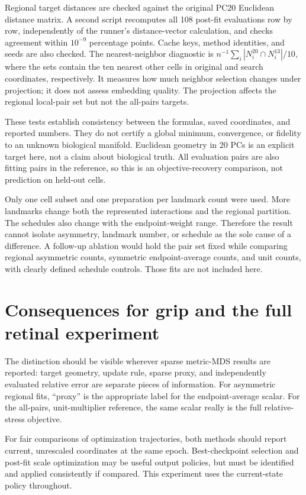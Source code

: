 \documentclass[11pt]{article}
\begin{document}
Regional target distances are checked against the original PC20 Euclidean
distance matrix. A second script recomputes all 108 post-fit evaluations
row by row, independently of the runner's distance-vector calculation,
and checks agreement within $10^{-9}$ percentage points. Cache keys,
method identities, and seeds are also checked.
The nearest-neighbor diagnostic is
$n^{-1}\sum_i |N_i^{20}\cap N_i^{13}|/10$, where the sets contain the ten
nearest other cells in original and search coordinates, respectively.
It measures how much neighbor selection changes under projection; it
does not assess embedding quality. The projection affects the regional
local-pair set but not the all-pairs targets.


These tests establish consistency between the formulas, saved coordinates,
and reported numbers. They do not certify a global minimum, convergence,
or fidelity to an unknown biological manifold. Euclidean geometry in 20 PCs
is an explicit target here, not a claim about biological truth.
All evaluation pairs are also fitting pairs in the reference, so this is
an objective-recovery comparison, not prediction on held-out cells.

Only one cell subset and one preparation per landmark count were used.
More landmarks change both the represented interactions and the regional
partition. The schedules also change with the endpoint-weight range.
Therefore the result cannot isolate asymmetry, landmark number, or schedule
as the sole cause of a difference. A follow-up ablation would hold the pair
set fixed while comparing regional asymmetric counts, symmetric
endpoint-average counts, and unit counts, with clearly defined schedule
controls. Those fits are not included here.



\section{Consequences for grip and the full retinal experiment}
The distinction should be visible wherever sparse metric-MDS results are
reported: target geometry, update rule, sparse proxy, and independently
evaluated relative error are separate pieces of information.
For asymmetric regional fits, ``proxy'' is the appropriate label for the
endpoint-average scalar. For the all-pairs, unit-multiplier reference, the
same scalar really is the full relative-stress objective.

For fair comparisons of optimization trajectories, both methods should
report current, unrescaled coordinates at the same epoch. Best-checkpoint
selection and post-fit scale optimization may be useful output policies,
but must be identified and applied consistently if compared.
This experiment uses the current-state policy throughout.
\end{document}
